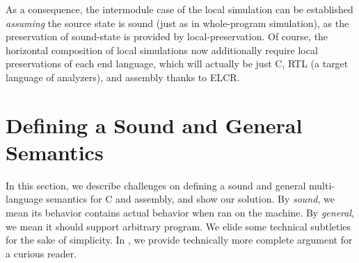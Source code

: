{As a consequence, the intermodule case of the local simulation can be
established \emph{assuming} the source state is sound (just as in
whole-program simulation), as the preservation of sound-state is
provided by local-preservation. Of course, the horizontal composition
of local simulations now additionally require local preservations of
each end language, which will actually be just C, RTL (a target
language of analyzers), and assembly thanks to ELCR.






















\section{Defining a Sound and General Semantics}\label{sec:overview:semantics}
In this section, we describe challenges on defining a sound and general multi-language semantics for C and assembly, and show our solution.
By \textit{sound}, we mean its behavior contains actual behavior when ran on the machine.
By \textit{general}, we mean it should support arbitrary program.
We elide some technical subtleties for the sake of simplicity.
In , we provide technically more complete argument for a curious reader.

}
